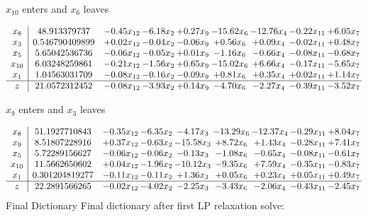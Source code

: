 \documentclass[8pt]{article}
\begin{document}
 $ x_{10} $ enters and $ x_{6} $ leaves 

 \[\begin{array}{c| c c@{\hskip 2pt} c@{\hskip 2pt} c@{\hskip 2pt} c@{\hskip 2pt} c@{\hskip 2pt} c@{\hskip 2pt} c@{\hskip 2pt} }
 x_{8}   &  48.913379737 & -0.45 x_{12} & -6.18 x_{2} & +  0.27 x_{9} & -15.62 x_{6} & -12.76 x_{4} & -0.22 x_{11} & +  6.05 x_{7}\\
 x_{3}   &  0.546790409899 & +  0.02 x_{12} & -0.04 x_{2} & -0.06 x_{9} & +  0.56 x_{6} & +  0.09 x_{4} & -0.02 x_{11} & +  0.48 x_{7}\\
 x_{5}   &  5.65042536736 & -0.06 x_{12} & -0.05 x_{2} & +  0.01 x_{9} & -1.16 x_{6} & -0.66 x_{4} & -0.08 x_{11} & -0.68 x_{7}\\
 x_{10}   &  6.03248259861 & -0.21 x_{12} & -1.56 x_{2} & +  0.65 x_{9} & -15.02 x_{6} & +  6.66 x_{4} & -0.17 x_{11} & -5.65 x_{7}\\
 x_{1}   &  1.04563031709 & -0.08 x_{12} & -0.16 x_{2} & -0.09 x_{9} & +  0.81 x_{6} & +  0.35 x_{4} & +  0.02 x_{11} & +  1.14 x_{7}\\
\hline
z    &  21.0572312452 & -0.08 x_{12} & -3.93 x_{2} & +  0.14 x_{9} & -4.70 x_{6} & -2.27 x_{4} & -0.39 x_{11} & -3.52 x_{7}\\
\end{array}\]


 $ x_{9} $ enters and $ x_{3} $ leaves 

 \[\begin{array}{c| c c@{\hskip 2pt} c@{\hskip 2pt} c@{\hskip 2pt} c@{\hskip 2pt} c@{\hskip 2pt} c@{\hskip 2pt} c@{\hskip 2pt} }
 x_{8}   &  51.1927710843 & -0.35 x_{12} & -6.35 x_{2} & -4.17 x_{3} & -13.29 x_{6} & -12.37 x_{4} & -0.29 x_{11} & +  8.04 x_{7}\\
 x_{9}   &  8.51807228916 & +  0.37 x_{12} & -0.63 x_{2} & -15.58 x_{3} & +  8.72 x_{6} & +  1.43 x_{4} & -0.28 x_{11} & +  7.41 x_{7}\\
 x_{5}   &  5.72289156627 & -0.06 x_{12} & -0.06 x_{2} & -0.13 x_{3} & -1.08 x_{6} & -0.65 x_{4} & -0.08 x_{11} & -0.61 x_{7}\\
 x_{10}   &  11.5662650602 & +  0.04 x_{12} & -1.96 x_{2} & -10.12 x_{3} & -9.35 x_{6} & +  7.59 x_{4} & -0.35 x_{11} & -0.83 x_{7}\\
 x_{1}   &  0.301204819277 & -0.11 x_{12} & -0.11 x_{2} & +  1.36 x_{3} & +  0.05 x_{6} & +  0.23 x_{4} & +  0.05 x_{11} & +  0.49 x_{7}\\
\hline
z    &  22.2891566265 & -0.02 x_{12} & -4.02 x_{2} & -2.25 x_{3} & -3.43 x_{6} & -2.06 x_{4} & -0.43 x_{11} & -2.45 x_{7}\\
\end{array}\]
Final Dictionary
Final dictionary after first LP relaxation solve: 
\end{document}

